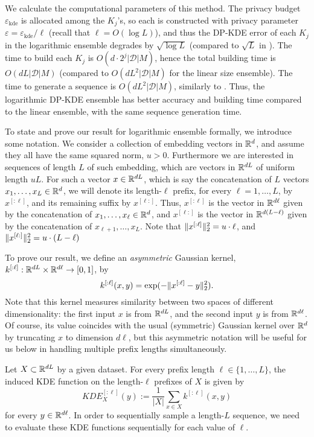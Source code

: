 We calculate the computational parameters of this method. 
The privacy budget $\varepsilon_{\mathrm{kde}}$ is allocated among the $K_j$'s, so each is constructed with privacy parameter $\varepsilon=\varepsilon_{\mathrm{kde}}/\ell$ (recall that $\ell=O(\log L)$), and thus the DP-KDE error of each $K_j$ in the logarithmic ensemble degrades by $\sqrt{\log L}$ (compared to $\sqrt L$ in ). The time to build each $K_j$ is $O(d\cdot 2^j|\mathcal D|M)$, hence the total building time is $O(dL|\mathcal D|M)$ (compared to $O(dL^2|\mathcal D|M)$ for the linear size ensemble). The time to generate a sequence is $O(dL^2|\mathcal D|M)$, similarly to . 
Thus, the logarithmic DP-KDE ensemble has better accuracy and building time compared to the linear ensemble, with the same sequence generation time.


To state and prove our result for logarithmic ensemble formally, we introduce some notation. 
We consider a collection of embedding vectors in $\mathbb R^d$, and assume they all have the same squared norm, $u>0$. 
Furthermore we are interested in sequences of length $L$ of such embedding, which are vectors in $\mathbb R^{dL}$ of uniform length $uL$. For such a vector $x\in\mathbb R^{dL}$, which is say the concatenation of $L$ vectors $x_1,\ldots,x_L\in\mathbb R^d$, we will denote its length-$\ell$ prefix, for every $\ell=1,\ldots,L$, by $x^{[:\ell]}$, and its remaining suffix by $x^{[\ell:]}$. 
Thus, $x^{[:\ell]}$ is the vector in $\mathbb R^{d\ell}$ given by the concatenation of $x_1,\ldots,x_\ell\in\mathbb R^d$, and $x^{[\ell:]}$ is the vector in $\mathbb R^{d(L-\ell)}$ given by the concatenation of $x_
{\ell+1},\ldots,x_L$. Note that $\lVert x^{[:\ell]}\rVert_2^2=u\cdot\ell$, and $\lVert x^{[\ell:]}\rVert_2^2=u\cdot(L-\ell)$

To prove our result, we define an \emph{asymmetric} Gaussian kernel, $k^{[:\ell]}:\mathbb R^{dL}\times\mathbb R^{d\ell}\rightarrow[0,1]$, by
\[ k^{[:\ell]}(x,y) = \exp(- 
 \lVert x^{[:\ell]}-y\rVert_2^2). 
\]
Note that this kernel measures similarity between two spaces of different dimensionality: the first input $x$ is from $\mathbb R^{dL}$, and the second input $y$ is from $\mathbb R^{d\ell}$. Of course, its value coincides with the usual (symmetric) Gaussian kernel over $\mathbb R^d$ by truncating $x$ to dimension $d\ell$, but this asymmetric notation will be useful for us below in handling multiple prefix lengths simultaneously. 


Let $X\subset\mathbb R^{dL}$ by a given dataset. For every prefix length $\ell\in\{1,\ldots,L\}$, the induced KDE function on the length-$\ell$ prefixes of $X$ is given by
\[
 KDE_X^{[:\ell]}(y) := \frac{1}{|X|}\sum_{x\in X}k^{[:\ell]}(x,y)
\]
for every $y\in\mathbb R^{d\ell}$. In order to sequentially sample a length-$L$ sequence, we need to evaluate these KDE functions sequentially for each value of $\ell$. 

